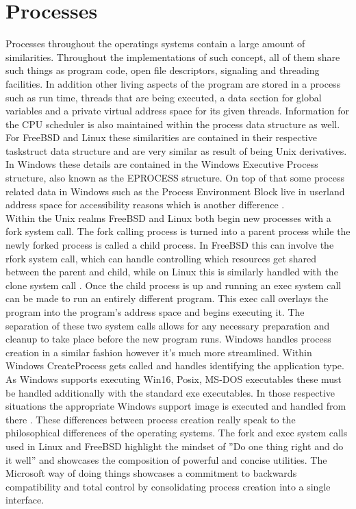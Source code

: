 \documentclass[letterpaper,10pt,draftclsnofoot,onecolumn]{IEEEtran}
\begin{document}
\section{Processes}
Processes throughout the operatings systems contain a large amount of similarities. Throughout the implementations of such concept, all of them share such things as program code, open file descriptors, signaling and threading facilities. In addition other living aspects of the program are stored in a process such as run time, threads that are being executed, a data section for global variables and a private virtual address space for its given threads. Information for the CPU scheduler is also maintained within the process data structure as well.\\
For FreeBSD and Linux these similarities are contained in their respective task\textunderscore struct data structure and are very similar as result of being Unix derivatives. In Windows these details are contained in the Windows Executive Process structure, also known as the EPROCESS structure. On top of that some process related data in Windows such as the Process Environment Block live in userland address space for accessibility reasons which is another difference \cite{russinovich}.\\
Within the Unix realms FreeBSD and Linux both begin new processes with a fork system call. The fork calling process is turned into a parent process while the newly forked process is called a child process. In FreeBSD this can involve the rfork system call, which can handle controlling which resources get shared between the parent and child, while on Linux this is similarly handled with the clone system call \cite{love}. Once the child process is up and running an exec system call can be made to run an entirely different program. This exec call overlays the program into the program’s address space and begins executing it. The separation of these two system calls allows for any necessary preparation and cleanup to take place before the new program runs. Windows handles process creation in a similar fashion however it’s much more streamlined. Within Windows CreateProcess gets called and handles identifying the application type. As Windows supports executing Win16, Posix, MS-DOS executables these must be handled additionally with the standard exe executables. In those respective situations the appropriate Windows support image is executed and handled from there \cite{russinovich}. These differences between process creation really speak to the philosophical differences of the operating systems. The fork and exec system calls used in Linux and FreeBSD highlight the mindset of ''Do one thing right and do it well'' and showcases the composition of powerful and concise utilities. The Microsoft way of doing things showcases a commitment to backwards compatibility and total control by consolidating process creation into a single interface.\\
\end{document}
